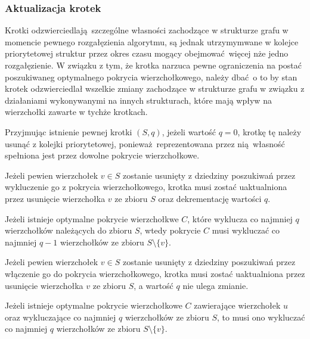 \subsubsection{\textbf{Aktualizacja krotek}}
\label{sss_ckx_updating_tuples}
\par{
  Krotki odzwierciedlają szczególne własności zachodzące w strukturze grafu w momencie pewnego rozgałęzienia algorytmu, są jednak utrzymymwane w kolejce priorytetowej struktur przez okres czasu mogący obejmować więcej nże jedno rozgałęzienie.
  W związku z tym, że krotka narzuca pewne ograniczenia na postać poszukiwaneg optymalnego pokrycia wierzchołkowego, należy dbać o to by stan krotek odzwierciedlał wszelkie zmiany zachodzące w strukturze grafu w związku z działaniami wykonywanymi na innych strukturach, które mają wpływ na wierzchołki zawarte w tychże krotkach.
}
\par{
  Przyjmując istnienie pewnej krotki $(S, q)$, jeżeli wartość $q = 0$, krotkę tę należy usunąć z kolejki priorytetowej, ponieważ reprezentowana przez nią własność spełniona jest przez dowolne pokrycie wierzchołkowe.
  \begin{theorem}
    Jeżeli pewien wierzchołek $v \in S$ zostanie usunięty z dziedziny poszukiwań przez wykluczenie go z pokrycia wierzchołkowego, krotka musi zostać uaktualniona przez usunięcie wierzchołka $v$ ze zbioru $S$ oraz dekrementację wartości $q$.
  \end{theorem}
  \begin{bproof}
    Jeżeli istnieje optymalne pokrycie wierzchołkwe $C$, które wyklucza co najmniej $q$ wierzchołków należących do zbioru $S$, wtedy pokrycie $C$ musi wykluczać co najmniej $q-1$ wierzchołków ze zbioru $S \setminus \{v\}$.
  \end{bproof}
  \begin{theorem}
    Jeżeli pewien wierzchołek $v \in S$ zostanie usunięty z dziedziny poszukiwań przez włączenie go do pokrycia wierzchołkowego, krotka musi zostać uaktualniona przez usunięcie wierzchołka $v$ ze zbioru $S$, a wartość $q$ nie ulega zmianie.
  \end{theorem}
  \begin{bproof}
    Jeżeli istnieje optymalne pokrycie wierzchołkowe $C$ zawierające wierzchołek $u$ oraz wykluczające co najmniej $q$ wierzchołków ze zbioru $S$, to musi ono wykluczać co najmniej $q$ wierzchołków ze zbioru $S \setminus \{v\}$.
  \end{bproof}
}
